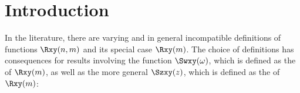 

\section{Introduction}
In the literature, there are varying and in general incompatible definitions of
 functions $\Rxy(n,m)$ and its  special case $\Rxy(m)$. %
The choice of definitions has consequences for results involving the  function
$\Swxy(\omega)$, %
which is defined as the  of $\Rxy(m)$,
as well as the more general $\Szxy(z)$,
which is defined as the  of $\Rxy(m)$:
\begin{definition}\label{def:Swxy}\label{def:Szxy}
\end{definition}

